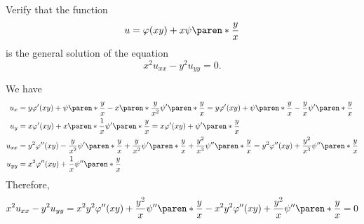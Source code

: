 \documentclass[11pt]{penrose}
\begin{document}
\begin{problem}{4}
    Verify that the function
    \begin{equation*}
        u = \varphi(xy) + x \psi\paren*{\frac{y}{x}}
    \end{equation*}
    is the general solution of the equation
    \begin{equation*}
        x^2 u_{xx} - y^2 u_{yy} = 0.
    \end{equation*}

    \solution We have
    \begin{align*}
        u_{x} &= y \varphi'(xy) + \psi\paren*{\frac{y}{x}} - x \paren*{\frac{y}{x^2}} \psi'\paren*{\frac{y}{x}} = y \varphi'(xy) + \psi\paren*{\frac{y}{x}} - \frac{y}{x} \psi'\paren*{\frac{y}{x}}\\
        u_{y} &= x \varphi'(xy) + x \paren*{\frac{1}{x}} \psi'\paren*{\frac{y}{x}} = x \varphi'(xy) + \psi'\paren*{\frac{y}{x}}\\
        u_{xx} &= y^2 \varphi''(xy) - \frac{y}{x^2} \psi'\paren*{\frac{y}{x}} + \frac{y}{x^2} \psi'\paren*{\frac{y}{x}} + \frac{y^2}{x^3} \psi''\paren*{\frac{y}{x}}
        = y^2 \varphi''(xy) + \frac{y^2}{x^3} \psi''\paren*{\frac{y}{x}}\\
        u_{yy} &= x^2 \varphi''(xy) + \frac{1}{x} \psi''\paren*{\frac{y}{x}}
    \end{align*}
    Therefore,
    \begin{equation*}
        x^2 u_{xx} - y^2 u_{yy} = x^2 y^2 \varphi''(xy) + \frac{y^2}{x} \psi''\paren*{\frac{y}{x}} - x^2 y^2 \varphi''(xy) + \frac{y^2}{x} \psi''\paren*{\frac{y}{x}} = 0
    \end{equation*}
\end{problem}
\end{document}
